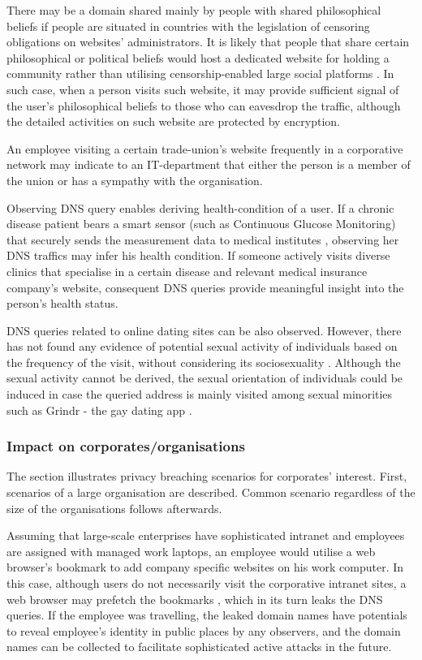 There may be a domain shared mainly by people with shared philosophical beliefs if people are situated in countries with the legislation of censoring obligations on websites' administrators.
It is likely that people that share certain philosophical or political beliefs would host a dedicated website for holding a community rather than utilising censorship-enabled large social platforms \cite{mackinnon2009china}.
In such case, when a person visits such website, it may provide sufficient signal of the user's philosophical beliefs to those who can eavesdrop the traffic, although the detailed activities on such website are protected by encryption.

An employee visiting a certain trade-union's website frequently in a corporative network may indicate to an IT-department that either the person is a member of the union or has a sympathy with the organisation. 

Observing DNS query enables deriving health-condition of a user. If a chronic disease patient bears a smart sensor (such as Continuous Glucose Monitoring) that securely sends the measurement data to medical institutes \cite{carelink-uploading, medtronic-watson}, observing her DNS traffics may infer his health condition.
If someone actively visits diverse clinics that specialise in a certain disease and relevant medical insurance company's website, consequent DNS queries provide meaningful insight into the person's health status.

DNS queries related to online dating sites can be also observed. However, there has not found any evidence of potential sexual activity of individuals based on the frequency of the visit, without considering its sociosexuality \cite{sevi2018exploring}. 
Although the sexual activity cannot be derived, the sexual orientation of individuals could be induced in case the queried address is mainly visited among sexual minorities such as Grindr - the gay dating app \cite{goedel2015geosocial}.

\subsubsection{Impact on corporates/organisations}
The section illustrates privacy breaching scenarios for corporates' interest. First, scenarios of a large organisation are described. Common scenario regardless of the size of the organisations follows afterwards.

Assuming that large-scale enterprises have sophisticated intranet and employees are assigned with managed work laptops, an employee would utilise a web browser's bookmark to add company specific websites on his work computer. In this case, although users do not necessarily visit the corporative intranet sites, a web browser may prefetch the bookmarks \cite{firefox-autocomplete-url, chrome-dns-prefectching}, which in its turn leaks the DNS queries. If the employee was travelling, the leaked domain names have potentials to reveal employee's identity in public places by any observers, and the domain names can be collected to facilitate sophisticated active attacks in the future.

